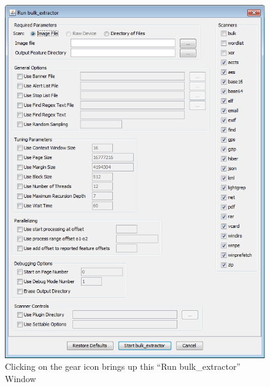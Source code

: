 \documentclass[11pt]{article} %
\begin{document}
\begin{figure}
	\center
	\includegraphics{viewerPics/runBulk.png}
	\caption{Clicking on the gear icon brings up this ``Run bulk\_extractor'' Window}
	\label{fig:runBulk3}
\end{figure}
\end{document}
